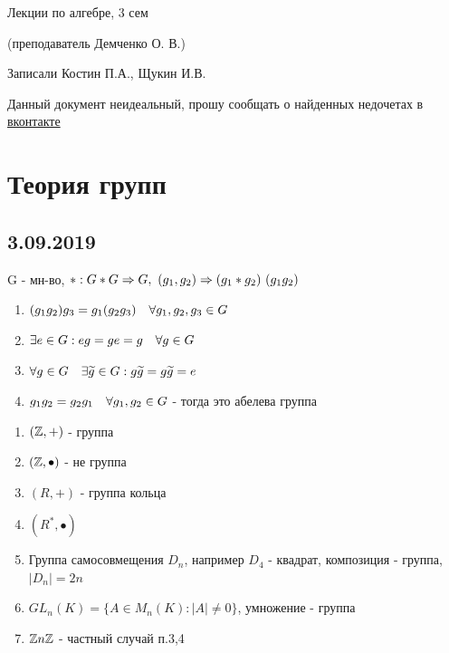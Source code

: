 \documentclass[12pt, fleqn]{article}
\begin{document}
\begin{center}
  \huge Лекции по алгебре, 3 сем
  
  \Large (преподаватель Демченко О. В.)
  
  \large Записали Костин П.А., Щукин И.В.
\end{center}

Данный документ неидеальный, прошу сообщать о найденных недочетах в \href{https://vk.com/drab_existence_a}{вконтакте}
\tableofcontents
\newpage

\section{Теория групп}
\subsection{3.09.2019}

\begin{definition}
    G - мн-во, $*:G*G \Rightarrow G,\ (g_1, g_2) \Rightarrow (g_1*g_2)\ (g_1g_2)$
    \begin{enumerate}                               
    	\item $(g_1g_2)g_3 = g_1(g_2g_3) \quad \forall g_1, g_2, g_3 \in G$
    	\item $\exists e \in G : e g = g e = g \quad \forall g \in G$
    	\item $\forall g \in G \quad \exists \widetilde{g} \in G : g\widetilde{g} = g \widetilde{g} = e$
    	\item $g_1g_2 = g_2g_1 \quad \forall g_1, g_2 \in G$ - тогда это абелева группа
	\end{enumerate} 
\end{definition}

\begin{example}
    \begin{enumerate}  
        \item $(\mathbb{Z},+)$ - группа
        \item $(\mathbb{Z}, \bullet)$ - не группа
        \item $(R, +)$ - группа кольца
        \item $(R^*, \bullet)$
        \item Группа самосовмещения $D_n$, например $D_4$ - квадрат, композиция - группа, $|D_n|=2n$
        \item $GL_n(K) = \{A \in M_n(K) : |A| \neq 0\}$, умножение - группа
        \item $\mathbb{Z} n \mathbb{Z}$ - частный случай п.3,4
    \end{enumerate} 
\end{example}
\end{document}
